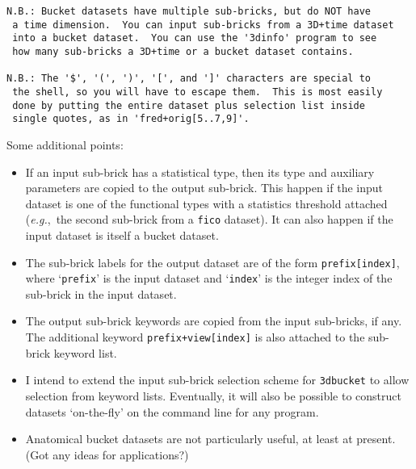 \begin{verbatim}
N.B.: Bucket datasets have multiple sub-bricks, but do NOT have
 a time dimension.  You can input sub-bricks from a 3D+time dataset
 into a bucket dataset.  You can use the '3dinfo' program to see
 how many sub-bricks a 3D+time or a bucket dataset contains.

N.B.: The '$', '(', ')', '[', and ']' characters are special to
 the shell, so you will have to escape them.  This is most easily
 done by putting the entire dataset plus selection list inside
 single quotes, as in 'fred+orig[5..7,9]'.
\end{verbatim}

\noindent
Some additional points:
\begin{itemize}
  \item If an input sub-brick has a statistical type, then its type
        and auxiliary parameters are copied to the output sub-brick.
        This happen if the input dataset is one of the functional
        types with a statistics threshold attached ({\it e.g.},~the
        second sub-brick from a {\tt fico} dataset).  It can also
        happen if the input dataset is itself a bucket dataset.

  \item The sub-brick labels for the output dataset are of the form
        {\tt prefix[index]}, where `{\tt prefix}' is the input
        dataset and `{\tt index}' is the integer index of the
        sub-brick in the input dataset.

  \item The output sub-brick keywords are copied from the input sub-bricks,
        if any.  The additional keyword {\tt prefix+view[index]} is also
        attached to the sub-brick keyword list.

  \item I intend to extend the input sub-brick selection scheme
        for {\tt 3dbucket} to allow selection from keyword lists.
        Eventually, it will also be possible to construct datasets
        `on-the-fly' on the command line for any program.

  \item Anatomical bucket datasets are not particularly useful,
        at least at present. (Got any ideas for applications?)
\end{itemize}

